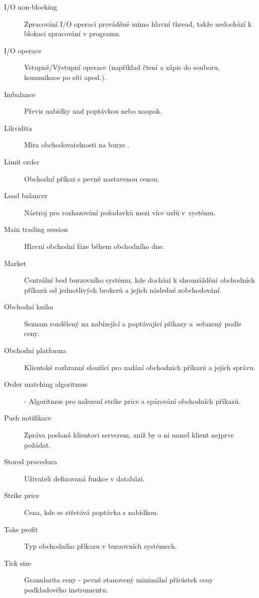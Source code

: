 \documentclass[thesis=M,czech]{FITthesis}[2012/06/26]
\begin{document}
\begin{description}
	\item[I/O non-blocking] Zpracování I/O operací prováděné mimo hlavní thread, takže nedochází k blokaci zpracování v programu.

	\item[I/O operace] Vstupně/Výstupní operace (například čtení a zápis do souboru, komunikace po síti apod.).

	\item[Imbalance] Převis nabídky nad poptávkou nebo naopak.

	\item[Likvidita] Míra obchodovatelnosti na burze .

	\item[Limit order] Obchodní příkaz s pevně nastavenou cenou.

	\item[Load balancer] Nástroj pro rozhazování požadavků mezi více uzlů v~systému.

	\item[Main trading session] Hlavní obchodní fáze během obchodního dne.

	\item[Market] Centrální bod burzovního systému, kde dochází k shromáždění obchodních příkazů od jednotlivých brokerů a jejich následné zobchodování.

	\item[Obchodní kniha] Seznam rozdělený na nabízející a poptávající příkazy a~seřazený podle ceny.

	\item[Obchodní platforma] Klientské rozhranní sloužící pro zadání obchodních příkazů a jejich správu.

	\item[Order matching algoritmus] - Algoritmus pro nalezení strike price a spárování obchodních příkazů.

	\item[Push notifikace] Zpráva poslaná klientovi serverem, aniž by o ni musel klient nejprve požádat.

	\item[Stored procedura] Uživateli definovaná funkce v databázi.

	\item[Strike price] Cena, kde se střetává poptávka s nabídkou.

	\item[Take profit] Typ obchodního příkazu v burzovních systémech.

	\item[Tick size] Granularita ceny - pevně stanovený minimální přírůstek ceny podkladového instrumentu.


\end{description}
\end{document}
